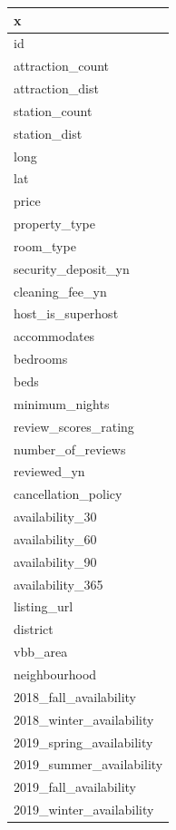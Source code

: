 \begin{table}[H]
\centering
\begin{tabular}{l}
  \hline
x \\ 
  \hline
id \\ 
  attraction\_count \\ 
  attraction\_dist \\ 
  station\_count \\ 
  station\_dist \\ 
  long \\ 
  lat \\ 
  price \\ 
  property\_type \\ 
  room\_type \\ 
  security\_deposit\_yn \\ 
  cleaning\_fee\_yn \\ 
  host\_is\_superhost \\ 
  accommodates \\ 
  bedrooms \\ 
  beds \\ 
  minimum\_nights \\ 
  review\_scores\_rating \\ 
  number\_of\_reviews \\ 
  reviewed\_yn \\ 
  cancellation\_policy \\ 
  availability\_30 \\ 
  availability\_60 \\ 
  availability\_90 \\ 
  availability\_365 \\ 
  listing\_url \\ 
  district \\ 
  vbb\_area \\ 
  neighbourhood \\ 
  2018\_fall\_availability \\ 
  2018\_winter\_availability \\ 
  2019\_spring\_availability \\ 
  2019\_summer\_availability \\ 
  2019\_fall\_availability \\ 
  2019\_winter\_availability \\ 
   \hline
\end{tabular}
\end{table}

\fi



